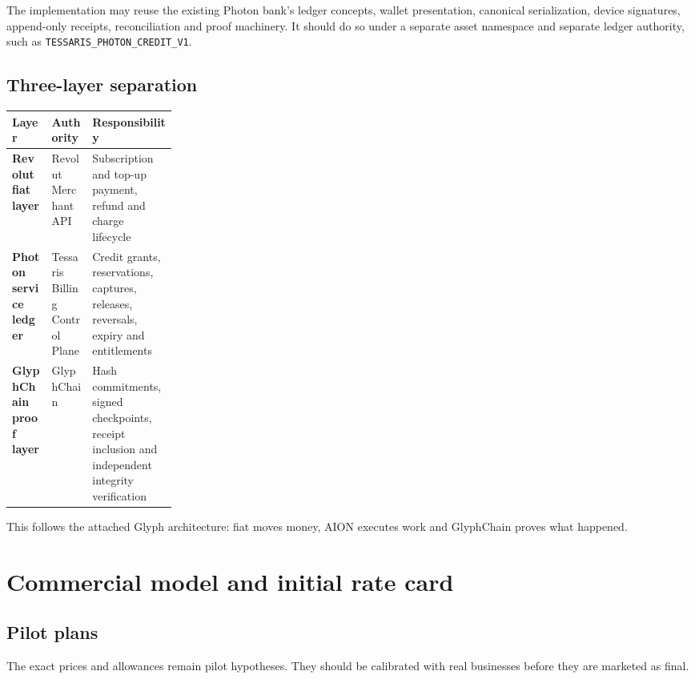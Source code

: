 \documentclass[11pt]{article}
\newcommand{\code}[1]{\texttt{#1}}
\begin{document}
The implementation may reuse the existing Photon bank's ledger concepts, wallet presentation, canonical serialization, device signatures, append-only receipts, reconciliation and proof machinery. It should do so under a separate asset namespace and separate ledger authority, such as \code{TESSARIS\_PHOTON\_CREDIT\_V1}.

\subsection{Three-layer separation}

\begin{center}
\begin{tabularx}{\linewidth}{>{\bfseries}p{0.24\linewidth} X X}
\toprule
Layer & Authority & Responsibility \\
\midrule
Revolut fiat layer & Revolut Merchant API & Subscription and top-up payment, refund and charge lifecycle \\
Photon service ledger & Tessaris Billing Control Plane & Credit grants, reservations, captures, releases, reversals, expiry and entitlements \\
GlyphChain proof layer & GlyphChain & Hash commitments, signed checkpoints, receipt inclusion and independent integrity verification \\
\bottomrule
\end{tabularx}
\end{center}

This follows the attached Glyph architecture: fiat moves money, AION executes work and GlyphChain proves what happened.

\section{Commercial model and initial rate card}

\subsection{Pilot plans}

The exact prices and allowances remain pilot hypotheses. They should be calibrated with real businesses before they are marketed as final.
\end{document}
